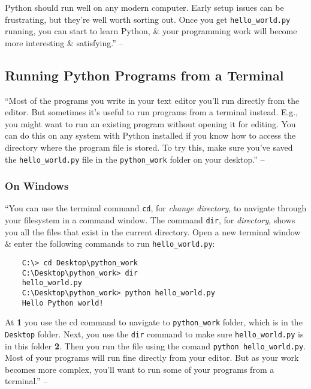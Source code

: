 \documentclass[oneside]{book}
\numberwithin{equation}{section}
\begin{document}
Python should run well on any modern computer. Early setup issues can be frustrating, but they're well worth sorting out. Once you get \verb|hello_world.py| running, you can start to learn Python, \& your programming work will become more interesting \& satisfying.'' -- \cite[p. 11]{Matthes2019}

\subsection{Running Python Programs from a Terminal}
``Most of the programs you write in your text editor you'll run directly from the editor. But sometimes it's useful to run programs from a terminal instead. E.g., you might want to run an existing program without opening it for editing. You can do this on any system with Python installed if you know how to access the directory where the program file is stored. To try this, make sure you've saved the \verb|hello_world.py| file in the \verb|python_work| folder on your desktop.'' -- \cite[p. 12]{Matthes2019}

\subsubsection{On Windows}
``You can use the terminal command \texttt{cd}, for \textit{change directory}, to navigate through your filesystem in a command window. The command \texttt{dir}, for \textit{directory}, shows you all the files that exist in the current directory. Open a new terminal window \& enter the following commands to run \verb|hello_world.py|:
\begin{verbatim}
	C:\> cd Desktop\python_work
	C:\Desktop\python_work> dir
	hello_world.py
	C:\Desktop\python_work> python hello_world.py
	Hello Python world!
\end{verbatim}
At \textbf{1} you use the cd command to navigate to \verb|python_work| folder, which is in the \texttt{Desktop} folder. Next, you use the \texttt{dir} command to make sure \verb|hello_world.py| is in this folder \textbf{2}. Then you run the file using the comand \verb|python hello_world.py|. Most of your programs will run fine directly from your editor. But as your work becomes more complex, you'll want to run some of your programs from a terminal.'' -- \cite[p. 12]{Matthes2019}
\end{document}
